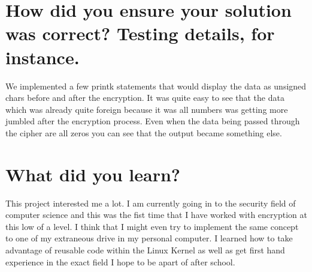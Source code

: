 \documentclass[letterpaper,10pt,notitlepage,fleqn]{article}
\begin{document}
\section*{How did you ensure your solution was correct? Testing details, for instance.}
    We implemented a few printk statements that would display the data as unsigned 
    chars before and after the encryption. It was quite easy to see that the data 
    which was already quite foreign because it was all numbers was getting more 
    jumbled after the encryption process. Even when the data being passed through 
    the cipher are all zeros you can see that the output became something else.

\section*{What did you learn?}
    This project interested me a lot. I am currently going in to the security field 
    of computer science and this was the fist time that I have worked with encryption 
    at this low of a level. I think that I might even try to implement the same 
    concept to one of my extraneous drive in my personal computer. I learned 
    how to take advantage of reusable code within the Linux Kernel as well as 
    get first hand experience in the exact field I hope to be apart of after school.
\end{document}
